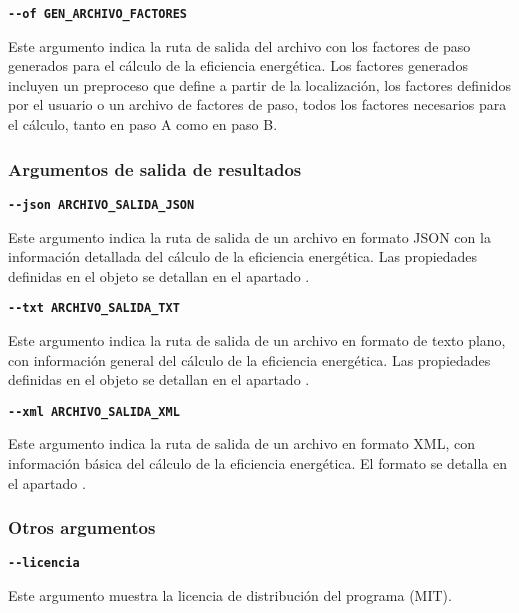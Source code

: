 \documentclass[10pt,notitlepage,oneside,a4paper]{article}
\begin{document}
\textbf{\texttt{-{}-of GEN\_ARCHIVO\_FACTORES}}

Este argumento indica la ruta de salida del archivo con los factores de paso generados para el cálculo de la eficiencia energética. Los factores generados incluyen un preproceso que define a partir de la localización, los factores definidos por el usuario o un archivo de factores de paso, todos los factores necesarios para el cálculo, tanto en paso A como en paso B.

\subsubsection{Argumentos de salida de resultados}

\textbf{\texttt{-{}-json ARCHIVO\_SALIDA\_JSON}}

Este argumento indica la ruta de salida de un archivo en formato JSON con la información detallada del cálculo de la eficiencia energética. Las propiedades definidas en el objeto se detallan en el apartado .

\textbf{\texttt{-{}-txt ARCHIVO\_SALIDA\_TXT}}

Este argumento indica la ruta de salida de un archivo en formato de texto plano, con información general del cálculo de la eficiencia energética. Las propiedades definidas en el objeto se detallan en el apartado .

\textbf{\texttt{-{}-xml ARCHIVO\_SALIDA\_XML}}

Este argumento indica la ruta de salida de un archivo en formato XML, con información básica del cálculo de la eficiencia energética. El formato se detalla en el apartado .

\subsubsection{Otros argumentos}



\textbf{\texttt{-{}-licencia}}

Este argumento muestra la licencia de distribución del programa (MIT).
\end{document}
